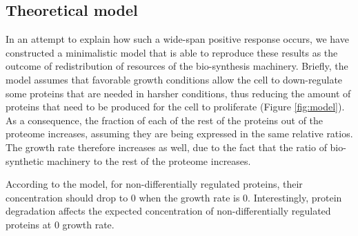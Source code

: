 \documentclass[a4paper,landscape,titlepage,17pt]{extarticle}
\begin{document}
\subsection*{Theoretical model}
In an attempt to explain how such a wide-span positive response occurs, we have constructed a minimalistic model that is able to reproduce these results as the outcome of redistribution of resources of the bio-synthesis machinery.
Briefly, the model assumes that favorable growth conditions allow the cell to down-regulate some proteins that are needed in harsher conditions, thus reducing the amount of proteins that need to be produced for the cell to proliferate (Figure \ref{fig:model}).
As a consequence, the fraction of each of the rest of the proteins out of the proteome increases, assuming they are being expressed in the same relative ratios.
The growth rate therefore increases as well, due to the fact that the ratio of bio-synthetic machinery to the rest of the proteome increases.

According to the model, for non-differentially regulated proteins, their concentration should drop to 0 when the growth rate is 0.
Interestingly, protein degradation affects the expected concentration of non-differentially regulated proteins at 0 growth rate.
\end{document}

